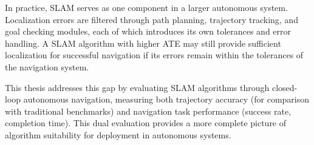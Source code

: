 In practice, SLAM serves as one component in a larger autonomous system. Localization errors are filtered through path planning, trajectory tracking, and goal checking modules, each of which introduces its own tolerances and error handling. A SLAM algorithm with higher ATE may still provide sufficient localization for successful navigation if its errors remain within the tolerances of the navigation system.

This thesis addresses this gap by evaluating SLAM algorithms through closed-loop autonomous navigation, measuring both trajectory accuracy (for comparison with traditional benchmarks) and navigation task performance (success rate, completion time). This dual evaluation provides a more complete picture of algorithm suitability for deployment in autonomous systems.

